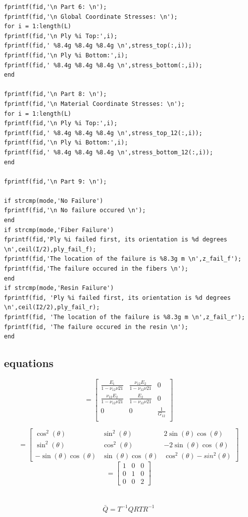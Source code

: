\documentclass[12pt]{article}
\begin{document}
\begin{lstlisting}
fprintf(fid,'\n Part 6: \n');
fprintf(fid,'\n Global Coordinate Stresses: \n');
for i = 1:length(L)
fprintf(fid,'\n Ply %i Top:',i); 
fprintf(fid,' %8.4g %8.4g %8.4g \n',stress_top(:,i));
fprintf(fid,'\n Ply %i Bottom:',i); 
fprintf(fid,' %8.4g %8.4g %8.4g \n',stress_bottom(:,i));
end

fprintf(fid,'\n Part 8: \n');
fprintf(fid,'\n Material Coordinate Stresses: \n');
for i = 1:length(L)
fprintf(fid,'\n Ply %i Top:',i); 
fprintf(fid,' %8.4g %8.4g %8.4g \n',stress_top_12(:,i));
fprintf(fid,'\n Ply %i Bottom:',i); 
fprintf(fid,' %8.4g %8.4g %8.4g \n',stress_bottom_12(:,i));
end

fprintf(fid,'\n Part 9: \n');

if strcmp(mode,'No Failure')
fprintf(fid,'\n No failure occured \n');
end
if strcmp(mode,'Fiber Failure')
fprintf(fid,'Ply %i failed first, its orientation is %d degrees \n',ceil(I/2),ply_fail_f);
fprintf(fid,'The location of the failure is %8.3g m \n',z_fail_f');
fprintf(fid,'The failure occured in the fibers \n');
end
if strcmp(mode,'Resin Failure')
fprintf(fid, 'Ply %i failed first, its orientation is %d degrees \n',ceil(I2/2),ply_fail_r);
fprintf(fid, 'The location of the failure is %8.3g m \n',z_fail_r');
fprintf(fid, 'The failure occured in the resin \n');
end
\end{lstlisting}

\subsection{equations}


\begin{equation}
[Q]=\left[\begin{matrix}
\frac{E_1}{1-\nu_{12}\nu{21}}&\frac{\nu_{12}E_2}{1-\nu_{12}\nu{21}}&0\\
\frac{\nu_{12}E_2}{1-\nu_{12}\nu{21}}&\frac{E_2}{1-\nu_{12}\nu{21}}&0\\
0&0&\frac{1}{G_{12}}\\
\end{matrix}\right]
\end{equation}

\begin{equation}
[T]=\left[\begin{matrix}
\cos^2(\theta)& \sin^2(\theta) & 2\sin(\theta)\cos(\theta)\\
 \sin^2(\theta) & \cos^2(\theta)& -2\sin(\theta)\cos(\theta)\\
 -\sin(\theta)\cos(\theta)&\sin(\theta)\cos(\theta)&\cos^2(\theta)-sin^2(\theta)
\end{matrix}\right]
\end{equation}
\begin{equation}
[R]=\left[\begin{matrix}
1 & 0 & 0\\ 0 & 1 & 0\\ 0& 0 &2
\end{matrix}\right]
\end{equation}
\\ \\
\begin{equation}
\bar{Q}=T^{-1} Q R T R^{-1}
\end{equation}
\end{document}
